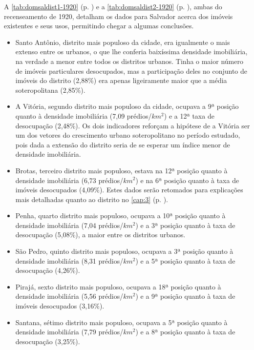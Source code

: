 % 

A \autoref{tab:domsaldist1-1920} (p. \pageref{tab:domsaldist1-1920}) e a \autoref{tab:domsaldist2-1920} (p. \pageref{tab:domsaldist2-1920}), ambas do recenseamento de 1920, detalham os dados para Salvador acerca dos imóveis existentes e seus usos, permitindo chegar a algumas conclusões.




\begin{itemize}
 \item Santo Antônio, distrito mais populoso da cidade, era igualmente o mais extenso entre os urbanos, o que lhe conferia baixíssima densidade imobiliária, na verdade a menor entre todos os distritos urbanos. Tinha o maior número de imóveis particulares desocupados, mas a participação deles no conjunto de imóveis do distrito (2,88\%) era apenas ligeiramente maior que a média soteropolitana (2,85\%).
 \item A Vitória, segundo distrito mais populoso da cidade, ocupava a 9ª posição quanto à densidade imobiliária (7,09 prédios/$km^{2}$) e a 12ª taxa de desocupação (2,48\%). Os dois indicadores reforçam a hipótese de a Vitória ser um dos vetores do crescimento urbano soteropolitano no período estudado, pois dada a extensão do distrito seria de se esperar um índice menor de densidade imobiliária.
 \item Brotas, terceiro distrito mais populoso, estava na 12ª posição quanto à densidade imobiliária (6,73 prédios/$km^{2}$) e na 6ª posição quanto à taxa de imóveis desocupados (4,09\%). Estes dados serão retomados para explicações mais detalhadas quanto ao distrito no \autoref{cap:3} (p. \pageref{cap:3}).
 \item Penha, quarto distrito mais populoso, ocupava a 10ª posição quanto à densidade imobiliária (7,04 prédios/$km^{2}$) e a 3ª posição quanto à taxa de desocupação (5,08\%), a maior entre os distritos urbanos. 
 \item São Pedro, quinto distrito mais populoso, ocupava a 3ª posição quanto à densidade imobiliária (8,31 prédios/$km^{2}$) e a 5ª posição quanto à taxa de desocupação (4,26\%).
 \item Pirajá, sexto distrito mais populoso, ocupava a 18ª posição quanto à densidade imobiliária (5,56 prédios/$km^{2}$) e a 9ª posição quanto à taxa de imóveis desocupados (3,16\%). 
 \item Santana, sétimo distrito mais populoso, ocupava a 5ª posição quanto à densidade imobiliária (7,79 prédios/$km^{2}$) e a 8ª posição quanto à taxa de desocupação (3,25\%).

\end{itemize}
